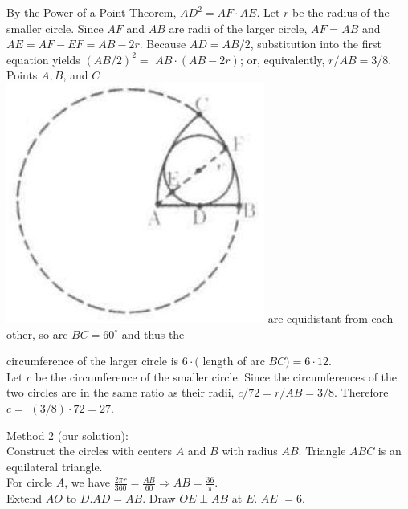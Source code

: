 \documentclass{article}
\begin{document}
By the Power of a Point Theorem, \(A D^{2}=A F \cdot A E\). Let \(r\) be the radius of the smaller circle. Since \(A F\) and \(A B\) are radii of the larger circle, \(A F=A B\) and \(A E=A F-E F=A B-2 r\). Because \(A D=A B / 2\), substitution into the first equation yields \((A B / 2)^{2}=\) \(A B \cdot(A B-2 r)\); or, equivalently, \(r / A B=3 / 8\). Points \(A, B\), and \(C\)\\
\includegraphics[width=\textwidth]{images/212.jpg} are equidistant from each other, so arc \(B C=60^{\circ}\) and thus the


circumference of the larger circle is \(6 \cdot(\) length of arc \(B C)=6 \cdot 12\).\\
Let \(c\) be the circumference of the smaller circle. Since the circumferences of the two circles are in the same ratio as their radii, \(c / 72=r / A B=3 / 8\). Therefore \(c=\) \((3 / 8) \cdot 72=27\).

Method 2 (our solution):\\
Construct the circles with centers \(A\) and \(B\) with radius \(A B\). Triangle \(A B C\) is an equilateral triangle.\\
For circle \(A\), we have \(\frac{2 \pi r}{360}=\frac{A B}{60} \Rightarrow A B=\frac{36}{\pi}\).\\
Extend \(A O\) to \(D . A D=A B\). Draw \(O E \perp A B\) at \(E\). \(A E\) \(=6\).
\end{document}
